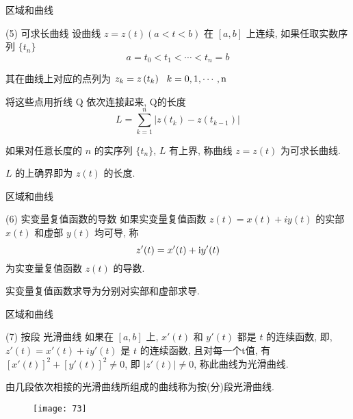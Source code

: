 \documentclass{beamer}
\begin{document}
\begin{frame}{区域和曲线}
\begin{alertblock}{(5) 可求长曲线}
设曲线 $ z = z(t) (a<t<b ) $ 在 $ [a, b] $ 上连续, 如果任取实数序列 $ \{t_n\} $ 
\[{{a}} = {{{t}}_0} < {{{t}}_1} < \cdots < {{{t}}_{{n}}} = {{b}}\]

其在曲线上对应的点列为 $ {{{z}}_{{k}}} = {{z}}\left( {{{{t}}_{{k}}}} \right)~~{{k}} = 0, 1, \cdots, {\rm{n}} $ 

将这些点用折线 Q 依次连接起来, Q的长度
\[{{L}} = \sum\limits_{{{k}} = 1}^{{n}} {|{{z}}({{{t}}_{{k}}}) - {{z}}({{{t}}_{{{k}} - 1}})|} \]

如果对任意长度的 $ n $ 的实序列 $ \{t_n\} $,  $ L $ 有上界, 称曲线 $ z = z(t) $ 为可求长曲线. 

 $ L $ 的上确界即为 $ z(t) $ 的长度. 

\end{alertblock}
\end{frame}

\begin{frame}{区域和曲线}
\begin{alertblock}{(6) 实变量复值函数的导数}
如果实变量复值函数  $ z(t) = x(t) + iy(t) $ 的实部 $ x(t) $ 和虚部 $ y(t) $ 均可导, 称
\[z'(t) = x'(t) + {\rm{i}}y'(t)\]
为实变量复值函数  $ z(t) $ 的导数. 

实变量复值函数求导为分别对实部和虚部求导. 


\end{alertblock}
\end{frame}

\begin{frame}{区域和曲线}
\begin{alertblock}{(7) 按段 光滑曲线}
如果在 $ [a, b] $ 上, $ x'(t) $ 和 $ y'(t) $ 都是 $ t $ 的连续函数, 即, $ z'(t)=x'(t)+iy'(t) $ 是 $ t $ 的连续函数, 且对每一个t值, 有 $ [x'(t)]^2+[y'(t)]^2 \neq 0 $, 即 $ |z'(t)| \neq 0 $, 称此曲线为光滑曲线. 

\bigskip

由几段依次相接的光滑曲线所组成的曲线称为按(分)段光滑曲线.
\begin{figure}
\texttt{[image: 73]}
\end{figure}
\end{alertblock}
\end{frame}
\end{document}
